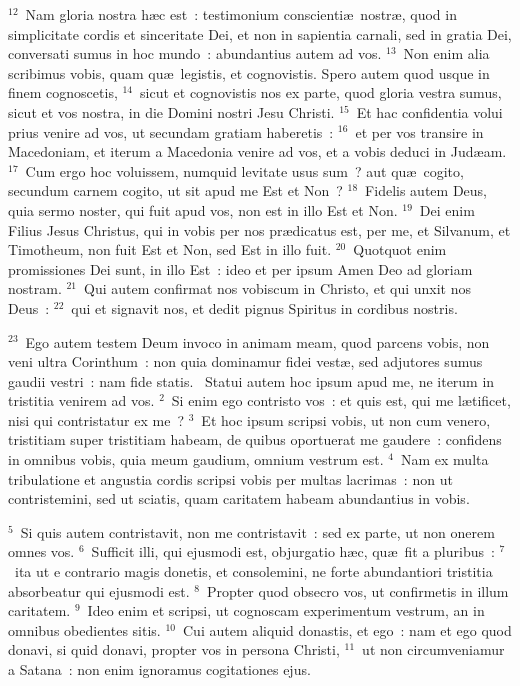 ${}^{12}$~Nam gloria nostra h\ae c est~: testimonium conscienti\ae\ nostr\ae , quod in simplicitate cordis et sinceritate Dei, et non in sapientia carnali, sed in gratia Dei, conversati sumus in hoc mundo~: abundantius autem ad vos.
${}^{13}$~Non enim alia scribimus vobis, quam qu\ae\ legistis, et cognovistis. Spero autem quod usque in finem cognoscetis,
${}^{14}$~sicut et cognovistis nos ex parte, quod gloria vestra sumus, sicut et vos nostra, in die Domini nostri Jesu Christi.
${}^{15}$~Et hac confidentia volui prius venire ad vos, ut secundam gratiam haberetis~:
${}^{16}$~et per vos transire in Macedoniam, et iterum a Macedonia venire ad vos, et a vobis deduci in Jud\ae am.
${}^{17}$~Cum ergo hoc voluissem, numquid levitate usus sum~? aut qu\ae\ cogito, secundum carnem cogito, ut sit apud me Est et Non~?
${}^{18}$~Fidelis autem Deus, quia sermo noster, qui fuit apud vos, non est in illo Est et Non.
${}^{19}$~Dei enim Filius Jesus Christus, qui in vobis per nos pr\ae dicatus est, per me, et Silvanum, et Timotheum, non fuit Est et Non, sed Est in illo fuit.
${}^{20}$~Quotquot enim promissiones Dei sunt, in illo Est~: ideo et per ipsum Amen Deo ad gloriam nostram.
${}^{21}$~Qui autem confirmat nos vobiscum in Christo, et qui unxit nos Deus~:
${}^{22}$~qui et signavit nos, et dedit pignus Spiritus in cordibus nostris.


${}^{23}$~Ego autem testem Deum invoco in animam meam, quod parcens vobis, non veni ultra Corinthum~: non quia dominamur fidei vest\ae , sed adjutores sumus gaudii vestri~: nam fide statis.
~Statui autem hoc ipsum apud me, ne iterum in tristitia venirem ad vos.
${}^{2}$~Si enim ego contristo vos~: et quis est, qui me l\ae tificet, nisi qui contristatur ex me~?
${}^{3}$~Et hoc ipsum scripsi vobis, ut non cum venero, tristitiam super tristitiam habeam, de quibus oportuerat me gaudere~: confidens in omnibus vobis, quia meum gaudium, omnium vestrum est.
${}^{4}$~Nam ex multa tribulatione et angustia cordis scripsi vobis per multas lacrimas~: non ut contristemini, sed ut sciatis, quam caritatem habeam abundantius in vobis.


${}^{5}$~Si quis autem contristavit, non me contristavit~: sed ex parte, ut non onerem omnes vos.
${}^{6}$~Sufficit illi, qui ejusmodi est, objurgatio h\ae c, qu\ae\ fit a pluribus~:
${}^{7}$~ita ut e contrario magis donetis, et consolemini, ne forte abundantiori tristitia absorbeatur qui ejusmodi est.
${}^{8}$~Propter quod obsecro vos, ut confirmetis in illum caritatem.
${}^{9}$~Ideo enim et scripsi, ut cognoscam experimentum vestrum, an in omnibus obedientes sitis.
${}^{10}$~Cui autem aliquid donastis, et ego~: nam et ego quod donavi, si quid donavi, propter vos in persona Christi,
${}^{11}$~ut non circumveniamur a Satana~: non enim ignoramus cogitationes ejus.



